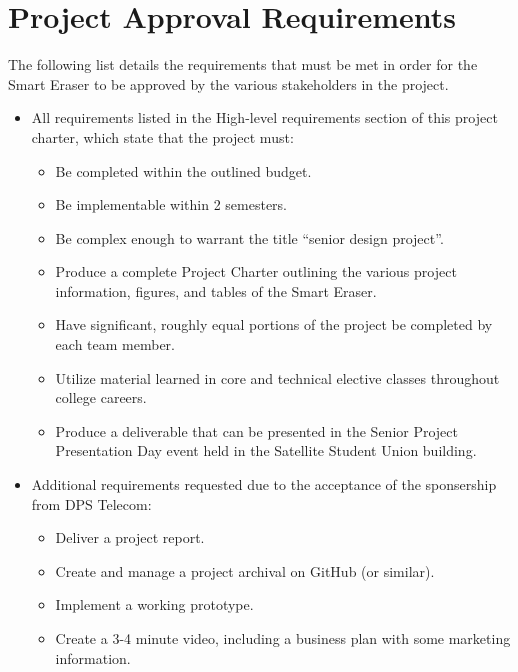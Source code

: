  \section{Project Approval Requirements}
 The following list details the requirements that must be met in order for the Smart Eraser to be approved by the various stakeholders in the project.
 \begin{itemize}
 	\item All requirements listed in the High-level requirements section of this project charter, which state that the project must:
	\begin{itemize}
		\item Be completed within the outlined budget.
		\item Be implementable within 2 semesters.
		\item Be complex enough to warrant the title ``senior design project''.
		\item Produce a complete Project Charter outlining the various project information, figures, and tables of the Smart Eraser.
		\item Have significant, roughly equal portions of the project be completed by each team member.
		\item Utilize material learned in core and technical elective classes throughout college careers.
		\item Produce a deliverable that can be presented in the Senior Project Presentation Day event held in the Satellite Student Union building.
	\end{itemize}
 	\item Additional requirements requested due to the acceptance of the sponsership from DPS Telecom:
 		\begin{itemize}
 			\item Deliver a project report.
 			\item Create and manage a project archival on GitHub (or similar).
 			\item Implement a working prototype.
 			\item Create a 3-4 minute video, including a business plan with some marketing information.
 		\end{itemize}
 \end{itemize}

